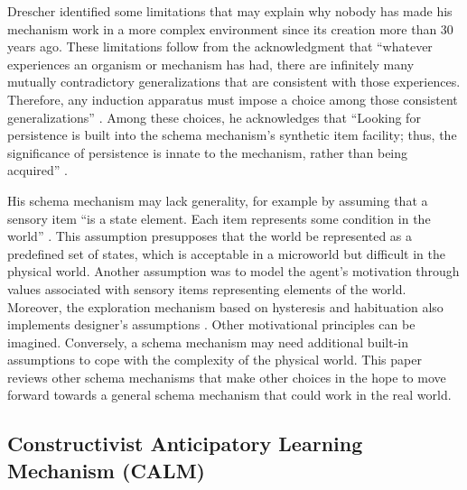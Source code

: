 \documentclass[runningheads]{llncs}
\begin{document}
Drescher identified some limitations that may explain why nobody has made his mechanism work in a more complex environment since its creation more than 30 years ago. 
These limitations follow from the acknowledgment that ``whatever experiences an organism or mechanism has had, there are infinitely many mutually contradictory generalizations that are consistent with those experiences. 
Therefore, any induction apparatus must impose a choice among those consistent generalizations'' \cite[p. 174]{drescher_made-up_1991}.
Among these choices, he acknowledges that ``Looking for persistence is built into the schema mechanism's synthetic item facility; thus, the significance of persistence is innate to the mechanism, rather than being acquired'' \cite[p. 84]{drescher_made-up_1991}.

His schema mechanism may lack generality, for example by assuming that a sensory item ``is a state element. Each item represents some condition in the world'' \cite[p. 56]{drescher_made-up_1991}. 
This assumption presupposes that the world be represented as a predefined set of states, which is acceptable in a microworld but difficult in the physical world. 
Another assumption was to model the agent's motivation through values associated with sensory items representing elements of the world. 
Moreover, the exploration mechanism based on hysteresis and habituation also implements designer's assumptions \cite[p. 66]{drescher_made-up_1991}.  
Other motivational principles can be imagined. 
Conversely, a schema mechanism may need additional built-in assumptions to cope with the complexity of the physical world.
This paper reviews other schema mechanisms that make other choices in the hope to move forward towards a general schema mechanism that could work in the real world.


\subsection{Constructivist Anticipatory Learning Mechanism (CALM)}
\end{document}
